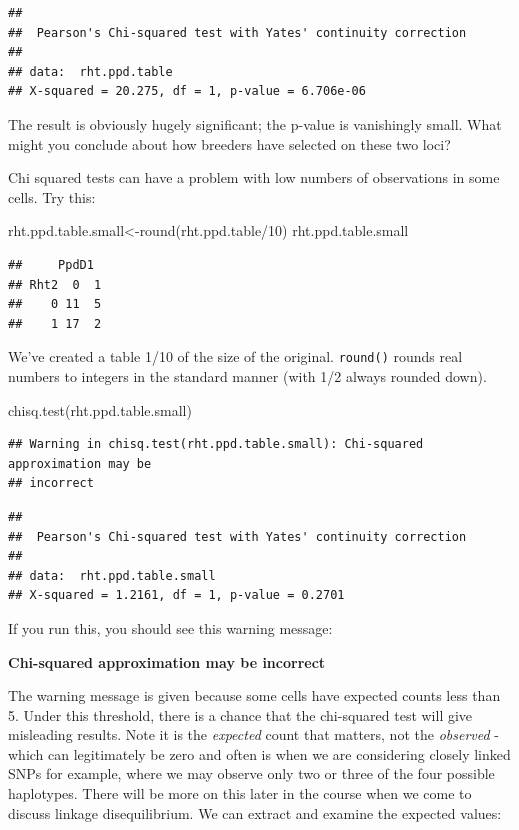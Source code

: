 \documentclass[
]{book}
\newenvironment{Shaded}{\begin{snugshade}}{\end{snugshade}}
\newcommand{\DecValTok}[1]{\textcolor[rgb]{0.00,0.00,0.81}{#1}}
\newcommand{\FunctionTok}[1]{\textcolor[rgb]{0.00,0.00,0.00}{#1}}
\newcommand{\NormalTok}[1]{#1}
\newcommand{\OtherTok}[1]{\textcolor[rgb]{0.56,0.35,0.01}{#1}}
\newcommand{\SpecialCharTok}[1]{\textcolor[rgb]{0.00,0.00,0.00}{#1}}
\begin{document}
\begin{verbatim}
## 
##  Pearson's Chi-squared test with Yates' continuity correction
## 
## data:  rht.ppd.table
## X-squared = 20.275, df = 1, p-value = 6.706e-06
\end{verbatim}

The result is obviously hugely significant; the p-value is vanishingly small. What might you conclude about how breeders have selected on these two loci?

Chi squared tests can have a problem with low numbers of observations in some cells. Try
this:

\begin{Shaded}
\begin{Highlighting}[]
\NormalTok{rht.ppd.table.small}\OtherTok{\textless{}{-}}\FunctionTok{round}\NormalTok{(rht.ppd.table}\SpecialCharTok{/}\DecValTok{10}\NormalTok{)}
\NormalTok{rht.ppd.table.small}
\end{Highlighting}
\end{Shaded}

\begin{verbatim}
##     PpdD1
## Rht2  0  1
##    0 11  5
##    1 17  2
\end{verbatim}

We've created a table 1/10 of the size of the original. \texttt{round()} rounds real numbers to integers in the standard manner (with 1/2 always rounded down).

\begin{Shaded}
\begin{Highlighting}[]
\FunctionTok{chisq.test}\NormalTok{(rht.ppd.table.small)}
\end{Highlighting}
\end{Shaded}

\begin{verbatim}
## Warning in chisq.test(rht.ppd.table.small): Chi-squared approximation may be
## incorrect
\end{verbatim}

\begin{verbatim}
## 
##  Pearson's Chi-squared test with Yates' continuity correction
## 
## data:  rht.ppd.table.small
## X-squared = 1.2161, df = 1, p-value = 0.2701
\end{verbatim}

If you run this, you should see this warning message:

\textbf{Chi-squared approximation may be incorrect}

The warning message is given because some cells have expected counts less than 5. Under this threshold, there is a chance that the chi-squared test will give misleading results. Note it is the \emph{expected} count that matters, not the \emph{observed} - which can legitimately be zero and often is when we are considering closely linked SNPs for example, where we may observe only two or three of the four possible haplotypes. There will be more on this later in the course when we come to discuss linkage disequilibrium. We can extract and examine the expected values:
\end{document}
